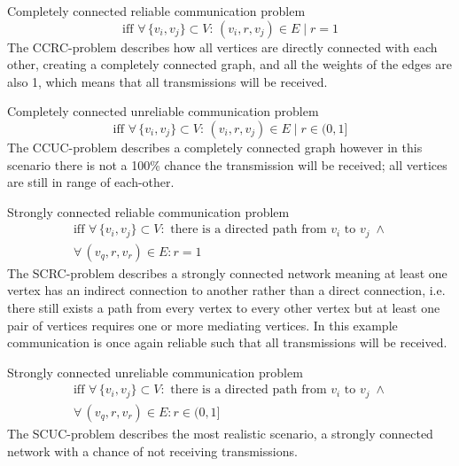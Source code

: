 \begin{description}[itemsep=2em]
    \item[CCRC-problem:] Completely connected reliable communication problem   
    \begin{equation}
    \text{iff } \forall\, \{v_i, v_j\} \subset V: \, (v_i,r,v_j)\in E \mid r = 1    
    \end{equation}
    The CCRC-problem describes how all vertices are directly connected with each other, creating a completely connected graph, and all the weights of the edges are also 1, which means that all transmissions will be received. 
    
    \item[CCUC-problem:] Completely connected unreliable communication problem
    \begin{equation}
    \text{iff } \forall\, \{v_i, v_j\} \subset V: \, (v_i,r,v_j)\in E \mid r \in (0, 1]
    \end{equation}
    The CCUC-problem describes a completely connected graph however in this scenario there is not a 100\% chance the transmission will be received; all vertices are still in range of each-other. 
    
    \item[SCRC-problem:] Strongly connected reliable communication problem
    \begin{equation}
    \begin{gathered}
    \text{iff } \forall\, \{v_i, v_j\} \subset V: \text{ there is a directed path from } v_i \text{ to } v_j\; \land \\ \forall\, (v_q, r, v_r) \in E : r = 1
    \end{gathered}  
    \end{equation}   
    The SCRC-problem describes a strongly connected network meaning at least one vertex has an indirect connection to another rather than a direct connection, i.e. there still exists a path from every vertex to every other vertex but at least one pair of vertices requires one or more mediating vertices. In this example communication is once again reliable such that all transmissions will be received. 
    
    \item[SCUC-problem:] Strongly connected unreliable communication problem
    \begin{equation}
    \begin{gathered}
    \text{iff } \forall\, \{v_i, v_j\} \subset V: \text{ there is a directed path from } v_i \text{ to } v_j\; \land \\ \forall\, (v_q, r, v_r) \in E : r \in (0, 1]
    \end{gathered}  
    \end{equation}    
    The SCUC-problem describes the most realistic scenario, a strongly connected network with a chance of not receiving transmissions. 
\end{description}
